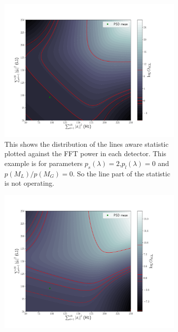 \begin{figure}
\centering

\begin{subfigure}[h]{\linewidth}
\begin{minipage}{0.65\linewidth}
\includegraphics[width=0.9\linewidth]{C3_soap/lookup_3d_2.pdf}
\end{minipage}\hfill
\begin{minipage}{0.35\linewidth}
\caption{This shows the distribution of the lines aware statistic plotted against the \ac{FFT} power in each detector. This example is for parameters $p_s(\lambda) = 2$,$p_l(\lambda) = 0$ and $p(M_L)/p(M_G) = 0$. So the line part of the statistic is not operating.}
\label{viterbi:plot:data}
\end{minipage}
\end{subfigure}
\begin{subfigure}[h]{\linewidth}
\begin{minipage}{0.65\linewidth}
\includegraphics[width=0.9\columnwidth]{C3_soap/lookup_3d_1.pdf}

\end{minipage}
\end{subfigure}
\end{figure}
